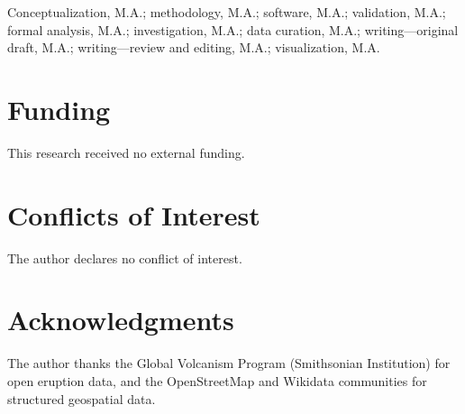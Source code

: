 \documentclass[12pt,a4paper]{article}
\begin{document}
Conceptualization, M.A.; methodology, M.A.; software, M.A.; validation, M.A.; formal analysis, M.A.; investigation, M.A.; data curation, M.A.; writing---original draft, M.A.; writing---review and editing, M.A.; visualization, M.A.

\section*{Funding}

This research received no external funding.

\section*{Conflicts of Interest}

The author declares no conflict of interest.

\section*{Acknowledgments}

The author thanks the Global Volcanism Program (Smithsonian Institution) for open eruption data, and the OpenStreetMap and Wikidata communities for structured geospatial data.



\end{document}
